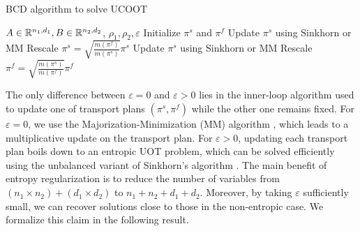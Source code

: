 \begin{algorithm}[t]
    \caption{BCD algorithm to solve UCOOT \label{alg:bcd}}
    \begin{algorithmic}
       $A \in \mathbb R^{n_1, d_1}, B \in \mathbb R^{n_2, d_2}$, $\rho_1, \rho_2, \varepsilon$
      \STATE Initialize $\pi^s$ and $\pi^f$
      \REPEAT
      \STATE Update $\pi^s$ using Sinkhorn or MM
      \STATE Rescale $\pi^s = \sqrt{\frac{m(\pi^f)}{m(\pi^s)}} \pi^s$
      \STATE Update $\pi^s$ using Sinkhorn or MM
      \STATE Rescale $\pi^f = \sqrt{\frac{m(\pi^s)}{m(\pi^f)}} \pi^f$
	\end{algorithmic}
\end{algorithm}
The only difference between $\varepsilon = 0$ and $\varepsilon > 0$
lies in the inner-loop algorithm used to update one of transport plans $(\pi^s, \pi^f)$
while the other one remains fixed.
For $\varepsilon=0$, we use the Majorization-Minimization (MM) algorithm \citep{Chapel21},
which leads to a multiplicative update on the transport plan.
For $\varepsilon > 0$, updating each transport plan boils down to an entropic UOT problem,
which can be solved efficiently using the unbalanced variant of Sinkhorn's algorithm \citep{Chizat18a}.
The main benefit of entropy regularization is to reduce the number of variables
from $(n_1 \times n_2) + (d_1 \times d_2)$ to $n_1 + n_2 + d_1 + d_2$.
Moreover, by taking $\varepsilon$ sufficiently small, we can recover solutions
close to those in the non-entropic case. We formalize this claim in the following result.
